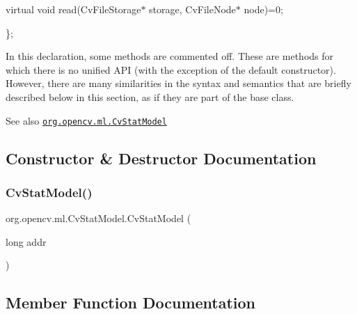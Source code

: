 {\ttfamily }

{\ttfamily virtual void read(\+Cv\+File\+Storage$\ast$ storage, Cv\+File\+Node$\ast$ node)=0;}

{\ttfamily }

{\ttfamily }

{\ttfamily \};}

{\ttfamily }

{\ttfamily }

{\ttfamily In this declaration, some methods are commented off. These are methods for which there is no unified A\+PI (with the exception of the default constructor). However, there are many similarities in the syntax and semantics that are briefly described below in this section, as if they are part of the base class. }

\begin{DoxySeeAlso}{See also}
\href{http://docs.opencv.org/modules/ml/doc/statistical_models.html#cvstatmodel}{\tt org.\+opencv.\+ml.\+Cv\+Stat\+Model} 
\end{DoxySeeAlso}


\subsection{Constructor \& Destructor Documentation}
\mbox{\label{classorg_1_1opencv_1_1ml_1_1_cv_stat_model_a9b196b1edff5a2616dbc574505274848}} 
\subsubsection{\texorpdfstring{Cv\+Stat\+Model()}{CvStatModel()}}
{\footnotesize\ttfamily org.\+opencv.\+ml.\+Cv\+Stat\+Model.\+Cv\+Stat\+Model (\begin{DoxyParamCaption}\item[{long}]{addr }\end{DoxyParamCaption})\hspace{0.3cm}{\ttfamily [protected]}}



\subsection{Member Function Documentation}
\mbox{\label{classorg_1_1opencv_1_1ml_1_1_cv_stat_model_a367b6d9b41e7ebbe5f960e8b7c480a26}} 
